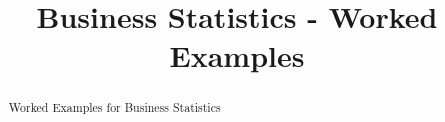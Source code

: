 \documentclass[12 pt]{report}
\title{Business Statistics - Worked Examples}
\author{}
\begin{document}
\maketitle

\begin{abstract}
Worked Examples for Business Statistics
\end{abstract}
\end{document}
